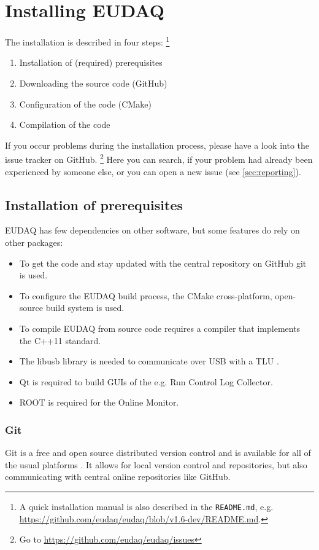 \section{Installing EUDAQ}

The installation is described in four steps:%
\footnote{A quick installation manual is also described in the \texttt{README.md}, e.g. \url{https://github.com/eudaq/eudaq/blob/v1.6-dev/README.md}.}
\begin{enumerate}
\item Installation of (required) prerequisites
\item Downloading the source code (GitHub)
\item Configuration of the code (CMake)
\item Compilation of the code
\end{enumerate}

If you occur problems during the installation process, please have a look into the issue tracker on GitHub.%
\footnote{Go to \url{https://github.com/eudaq/eudaq/issues}} 
Here you can search, if your problem had already been experienced by someone else, or you can open a new issue (see \autoref{sec:reporting}).

\subsection{Installation of prerequisites}

EUDAQ has few dependencies on other software, but some features do rely on other packages:
\begin{itemize}
\item To get the code and stay updated with the central repository on GitHub git is used.
\item To configure the EUDAQ build process, the CMake cross-platform, open-source build system is used.
\item To compile EUDAQ from source code requires a compiler that implements the C++11 standard.
\item The libusb library is needed to communicate over USB with a \gls{TLU} \cite{Cussans2009}.
\item Qt is required to build GUIs of the e.g. Run Control Log Collector. 
\item ROOT is required for the Online Monitor.
\end{itemize}

\subsubsection{Git}
Git is a free and open source distributed version control and is available for all of the usual platforms \cite{gitWWW}. 
It allows for local version control and repositories, but also communicating with central online repositories like GitHub.
   
